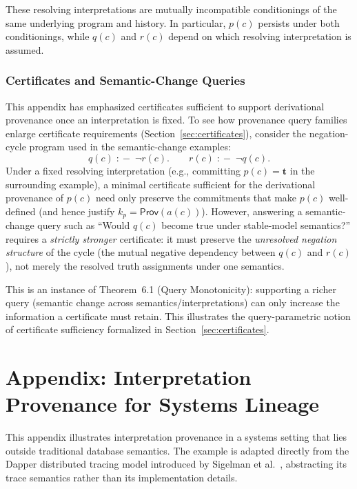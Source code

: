 \documentclass[acmsmall,nonacm]{acmart}
\theoremstyle{remark}
\numberwithin{definition}{section}
\numberwithin{theorem}{section}
\numberwithin{lemma}{section}
\numberwithin{corollary}{section}
\numberwithin{remark}{section}
\numberwithin{example}{section}
\numberwithin{observation}{section}
\numberwithin{assumption}{section}
\newcommand{\drule}{\mathrel{:\!-}}
\newcommand{\Prov}{\mathsf{Prov}}
\begin{document}
These resolving interpretations are mutually incompatible conditionings of the
same underlying program and history.
In particular, $p(c)$ persists under both conditionings, while $q(c)$ and $r(c)$
depend on which resolving interpretation is assumed.

\subsubsection{Certificates and Semantic-Change Queries}

This appendix has emphasized certificates sufficient to support derivational provenance once an interpretation is fixed. To see how provenance query families enlarge certificate requirements (Section~\ref{sec:certificates}), consider the negation-cycle program used in the semantic-change examples:
\[
  q(c) \;\drule\; \neg r(c).\qquad
  r(c) \;\drule\; \neg q(c).
\]
Under a fixed resolving interpretation (e.g., committing $p(c)=\mathbf{t}$ in the surrounding example), a minimal certificate sufficient for the derivational provenance of $p(c)$ need only preserve the commitments that make $p(c)$ well-defined (and hence justify $k_p=\Prov(a(c))$). However, answering a semantic-change query such as “Would $q(c)$ become true under stable-model semantics?” requires a \emph{strictly stronger} certificate: it must preserve the \emph{unresolved negation structure} of the cycle (the mutual negative dependency between $q(c)$ and $r(c)$), not merely the resolved truth assignments under one semantics.

This is an instance of Theorem~6.1 (Query Monotonicity): supporting a richer query (semantic change across semantics/interpretations) can only increase the information a certificate must retain. This illustrates the query-parametric notion of certificate sufficiency formalized in Section~\ref{sec:certificates}.

\section{Appendix: Interpretation Provenance for Systems Lineage}
\label{app:systems-lineage}

This appendix illustrates interpretation provenance in a systems setting that
lies outside traditional database semantics.
The example is adapted directly from the Dapper distributed tracing model
introduced by Sigelman et al.~\cite{sigelman2010dapper}, abstracting its trace
semantics rather than its implementation details.
\end{document}
